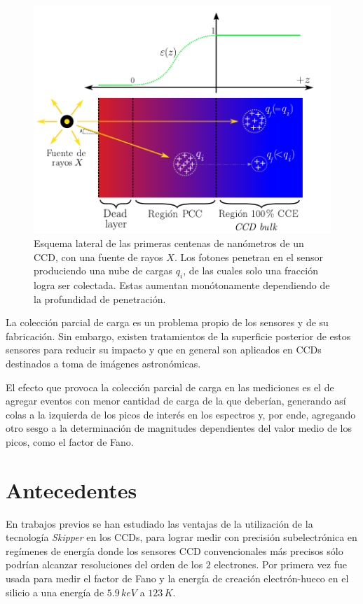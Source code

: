 \begin{figure}%
    \centering
        \includegraphics[scale=.8]{Figs/PCC.pdf}
    \caption{Esquema lateral de las primeras centenas de nanómetros de un CCD, con una fuente de rayos $X$\cite{PCC-CCE}. Los fotones penetran en el sensor produciendo una nube de cargas $q_{i}$, de las cuales solo una fracción logra ser colectada. Estas aumentan monótonamente dependiendo de la profundidad de penetración.}
    \label{fig:PCC}
\end{figure}
La colección parcial de carga es un problema propio de los sensores y de su fabricación. Sin embargo, existen tratamientos de la superficie posterior de estos sensores para reducir su impacto y que en general son aplicados en CCDs destinados a toma de imágenes astronómicas. 

El efecto que provoca la colección parcial de carga en las mediciones es el de agregar eventos con menor cantidad de carga de la que deberían, generando así colas a la izquierda de los picos de interés en los espectros y, por ende, agregando otro sesgo a la determinación de magnitudes dependientes del valor medio de los picos, como el factor de Fano.


\section{Antecedentes \label{sec:Antecedentes}}
\noindent En trabajos previos se han estudiado las ventajas de la utilización de la tecnología \textit{Skipper} en los CCDs, para lograr medir con precisión subelectrónica en regímenes de energía donde los sensores CCD convencionales más precisos sólo podrían alcanzar resoluciones del orden de los $2$ electrones. Por primera vez fue usada para medir el factor de Fano y la energía de creación electrón-hueco en el silicio a una energía de $5.9\,\si{keV}$ a $123\,\si{K}$\cite{Rodrigues}.

